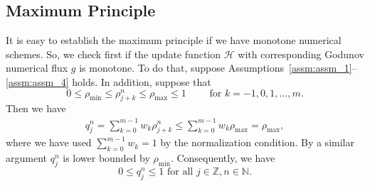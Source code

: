 
\subsection{Maximum Principle}\label{subsec:mono}

It is easy to establish the maximum principle if we have monotone numerical schemes. So, we check first if the update function $\mathcal{H}$ with corresponding Godunov numerical flux $g$ is monotone. To do that, suppose Assumptions~\ref{assm:assm_1}--\ref{assm:assm_4} holds. In addition, suppose that
\[0 \leq \rho_{\min} \leq  \rho_{j+k}^{n} \leq \rho_{\max} \leq 1 \qquad \text{ for } k = -1, 0,1,\dots,m.\]
Then we have
\begin{equation}\label{eq:q_j_equality}
    \begin{split}
        q_{j}^{n}  = \sum_{k=0}^{m-1} w_k \rho_{j+k}^{n} \leq \sum_{k=0}^{m-1} w_k \rho_{\max}= \rho_{\max},
    \end{split}
\end{equation}
where we have used $\sum_{k=0}^{m-1} w_k = 1$ by the normalization condition. By a similar argument $q_{j}^{n}$ is lower bounded by $\rho_{\min}$. Consequently, we have
\begin{equation}\label{eq:q_bound}
    0 \leq q_{j}^{n} \leq 1 \text{ for all } j\in \mathbb{Z}, n \in \mathbb{N}.
\end{equation}

